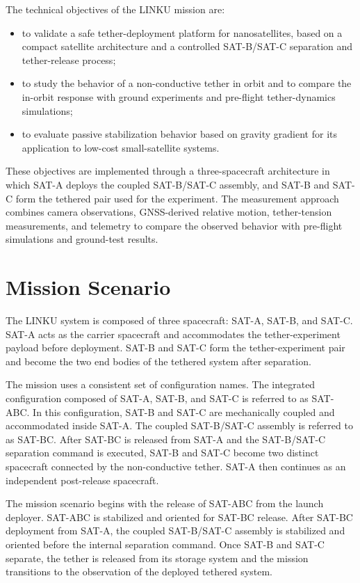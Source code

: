 The technical objectives of the LINKU mission are:
\begin{itemize}
    \item to validate a safe tether-deployment platform for nanosatellites, based on a compact satellite architecture and a controlled SAT-B/SAT-C separation and tether-release process;

    \item to study the behavior of a non-conductive tether in orbit and to compare the in-orbit response with ground experiments and pre-flight tether-dynamics simulations;

    \item to evaluate passive stabilization behavior based on gravity gradient for its application to low-cost small-satellite systems.
\end{itemize}

These objectives are implemented through a three-spacecraft architecture in which SAT-A deploys the coupled SAT-B/SAT-C assembly, and SAT-B and SAT-C form the tethered pair used for the experiment. The measurement approach combines camera observations, GNSS-derived relative motion, tether-tension measurements, and telemetry to compare the observed behavior with pre-flight simulations and ground-test results.

\section{Mission Scenario}
\label{sec:mission_scenario}

The LINKU system is composed of three spacecraft: SAT-A, SAT-B, and SAT-C. SAT-A acts as the carrier spacecraft and accommodates the tether-experiment payload before deployment. SAT-B and SAT-C form the tether-experiment pair and become the two end bodies of the tethered system after separation.

The mission uses a consistent set of configuration names. The integrated configuration composed of SAT-A, SAT-B, and SAT-C is referred to as SAT-ABC. In this configuration, SAT-B and SAT-C are mechanically coupled and accommodated inside SAT-A. The coupled SAT-B/SAT-C assembly is referred to as SAT-BC. After SAT-BC is released from SAT-A and the SAT-B/SAT-C separation command is executed, SAT-B and SAT-C become two distinct spacecraft connected by the non-conductive tether. SAT-A then continues as an independent post-release spacecraft.

The mission scenario begins with the release of SAT-ABC from the launch deployer. SAT-ABC is stabilized and oriented for SAT-BC release. After SAT-BC deployment from SAT-A, the coupled SAT-B/SAT-C assembly is stabilized and oriented before the internal separation command. Once SAT-B and SAT-C separate, the tether is released from its storage system and the mission transitions to the observation of the deployed tethered system.

